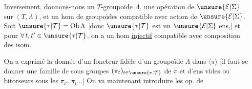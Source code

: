Inversement, donnons-nous  un $T$-groupoïde  $\Lambda$, une opération de $\unsure{\mathcal E|\Sigma}$ sur $(T,\Lambda)$, et un hom de groupoïdes
compatible avec action de $\unsure{\mathcal E|\Sigma}$.
Soit $\unsure{\tau|\mathcal T}=\operatorname{Ob}\Lambda$ [donc $\unsure{\tau|\mathcal T}$ est un $\unsure{\mathcal E|\Sigma}$ ens,] et pour $\forall\,t,t'\in\unsure{\tau|\mathcal T}$, on a un hom \uline{injectif}
compatible avec composition des isom.

On a exprimé la donnée d'un foncteur fidèle d'un groupoïde $\Lambda$ dans $\langle\pi\rangle$  [il faut se donner une famille de sous groupes $(\pi_t)_{t\in\unsure{\tau|\mathcal T}}$ de $\pi$ et d'ens vides ou bitorseurs sous les $\pi_{t'},\pi_t\ldots$] On va maintenant introduire les op. de
